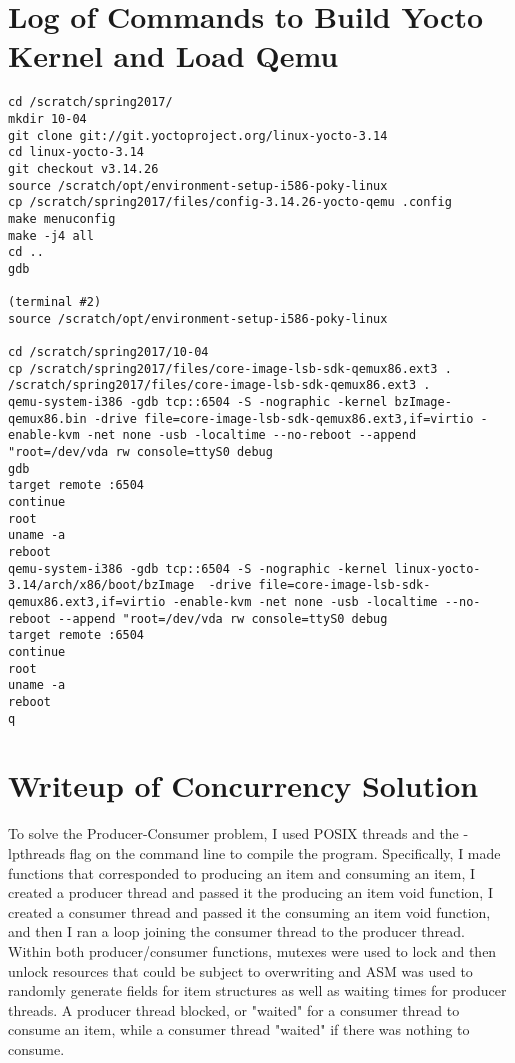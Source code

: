 \documentclass[letterpaper,10pt,titlepage]{article}
\begin{document}
\section{Log of Commands to Build Yocto Kernel and Load Qemu}
\begin{lstlisting}
cd /scratch/spring2017/
mkdir 10-04
git clone git://git.yoctoproject.org/linux-yocto-3.14
cd linux-yocto-3.14
git checkout v3.14.26
source /scratch/opt/environment-setup-i586-poky-linux
cp /scratch/spring2017/files/config-3.14.26-yocto-qemu .config
make menuconfig
make -j4 all
cd ..
gdb

(terminal #2)
source /scratch/opt/environment-setup-i586-poky-linux

cd /scratch/spring2017/10-04
cp /scratch/spring2017/files/core-image-lsb-sdk-qemux86.ext3 .
/scratch/spring2017/files/core-image-lsb-sdk-qemux86.ext3 .
qemu-system-i386 -gdb tcp::6504 -S -nographic -kernel bzImage-qemux86.bin -drive file=core-image-lsb-sdk-qemux86.ext3,if=virtio -enable-kvm -net none -usb -localtime --no-reboot --append "root=/dev/vda rw console=ttyS0 debug
gdb
target remote :6504
continue
root
uname -a
reboot
qemu-system-i386 -gdb tcp::6504 -S -nographic -kernel linux-yocto-3.14/arch/x86/boot/bzImage  -drive file=core-image-lsb-sdk-qemux86.ext3,if=virtio -enable-kvm -net none -usb -localtime --no-reboot --append "root=/dev/vda rw console=ttyS0 debug
target remote :6504
continue
root
uname -a
reboot
q
\end{lstlisting}

\section{Writeup of Concurrency Solution}
To solve the Producer-Consumer problem, I used POSIX threads and the -lpthreads flag on the command line to compile the program. Specifically, I made functions that corresponded to producing an item and consuming an item, I created a producer thread and passed it the producing an item void function, I created a consumer thread and passed it the consuming an item void function, and then I ran a loop joining the consumer thread to the producer thread. Within both producer/consumer functions, mutexes were used to lock and then unlock resources that could be subject to overwriting and ASM was used to randomly generate fields for item structures as well as waiting times for producer threads. A producer thread blocked, or "waited" for a consumer thread to consume an item, while a consumer thread "waited" if there was nothing to consume.
\end{document}
